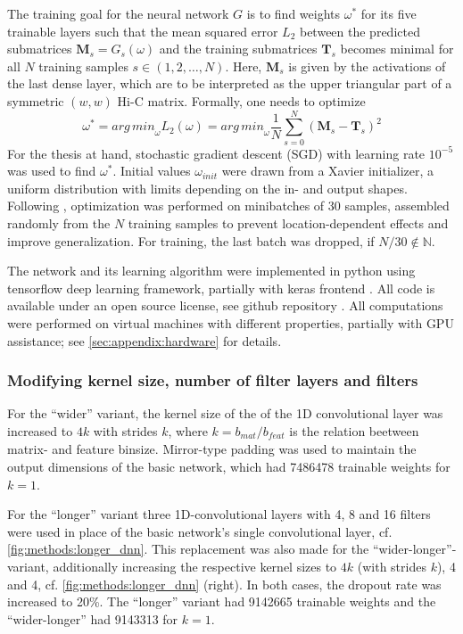 The training goal for the neural network $G$ is to find weights $\omega^*$ for its five trainable layers 
such that the mean squared error $L_2$ between the predicted submatrices $\mathbf{M}_s = G_s(\omega)$ 
and the training submatrices $\mathbf{T}_s$ becomes minimal for all $N$ training samples $s \in (1,2,\dots, N)$. 
Here, $\mathbf{M}_s$ is given by the activations of the last dense layer, which are to be interpreted as the upper triangular 
part of a symmetric $(w, w)$ Hi-C matrix.
Formally, one needs to optimize
\begin{equation}
 \omega^* = \mathit{arg\,min}_\omega L_2(\omega) = \mathit{arg\,min}_\omega \frac{1}{N} \sum_{s=0}^N (\mathbf{M}_s - \mathbf{T}_s)^2 \label{eq:methods:nn-mse}
\end{equation} 
For the thesis at hand, stochastic gradient descent (SGD) with learning rate $10^{-5}$  was used to find $\omega^*$.
Initial values $\omega_\mathit{init}$ were drawn from a Xavier initializer, a uniform distribution with limits depending on the in- and output shapes.
Following \cite{Farre2018a}, optimization was performed on minibatches of 30 samples, assembled randomly from the $N$ training samples
to prevent location-dependent effects and improve generalization.
For training, the last batch was dropped, if $N/30 \not \in \mathbb{N}$. 

The network and its learning algorithm were implemented in python using tensorflow deep learning framework, partially with keras frontend \cite{Abadi2015,Chollet2015}.
All code is available under an open source license, see github repository \cite{Krauth2021b}. 
All computations were performed on virtual machines with different properties, partially with GPU assistance; see \ref{sec:appendix:hardware} for details.

\subsubsection{Modifying kernel size, number of filter layers and filters} \label{sec:methods:variants}
For the ``wider'' variant, the kernel size of the of the 1D convolutional layer was increased to $4k$ with strides $k$,
where $k=b_\mathit{mat}/b_\mathit{feat}$ is the relation beetween matrix- and feature binsize.
Mirror-type padding was used to maintain the output dimensions of the basic network, which had \SI{7486478}{} trainable weights
for $k=1$.

For the ``longer'' variant three 1D-convolutional layers with 4, 8 and 16 filters 
were used in place of the basic network's single convolutional layer, cf. \cref{fig:methods:longer_dnn}.
This replacement was also made for the ``wider-longer''-variant, 
additionally increasing the respective kernel sizes to $4k$ (with strides $k$), 4 and 4, cf. \cref{fig:methods:longer_dnn} (right).
In both cases, the dropout rate was increased to 20\%.
The ``longer'' variant had \SI{9142665}{} trainable weights and the ``wider-longer''
had \SI{9143313}{} for $k=1$.

